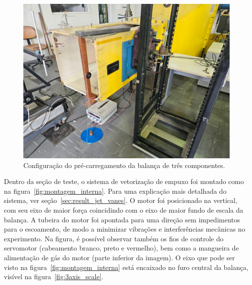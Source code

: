 \begin{figure}[htbp]
    \centering
    \includegraphics[height=0.45\textheight]{img/montagem_externa.jpeg}
    \caption{Configuração do pré-carregamento da balança de três componentes.}\label{fig:pre_loading}
\end{figure}

Dentro da seção de teste, o sistema de vetorização de empuxo foi montado como na figura~\ref{fig:montagem_interna}. Para uma explicação mais detalhada do sistema, ver seção~\ref{sec:result_jet_vanes}. O motor foi posicionado na vertical, com seu eixo de maior força coincidindo com o eixo de maior fundo de escala da balança. A tubeira do motor foi apontada para uma direção sem impedimentos para o escoamento, de modo a minimizar vibrações e interferências mecânicas no experimento. Na figura, é possível observar também os fios de controle do servomotor (cabeamento branco, preto e vermelho), bem como a mangueira de alimentação de gás do motor (parte inferior da imagem). O eixo que pode ser visto na figura~\ref{fig:montagem_interna} está encaixado no furo central da balança, visível na figura~\ref{fig:3axis_scale}.

